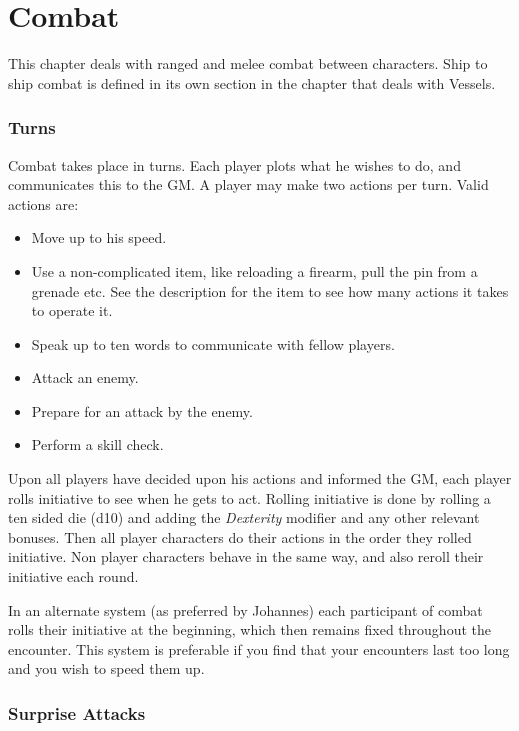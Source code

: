 \chapter{Combat}

This chapter deals with ranged and melee combat between characters. Ship to ship
combat is defined in its own section in the chapter that deals with Vessels.

\subsection{Turns}

Combat takes place in turns. Each player plots what he wishes to do, and
communicates this to the GM. A player may make two actions per turn. Valid
actions are:

\begin{itemize}
\item Move up to his speed.
\item Use a non-complicated item, like reloading a firearm, pull the pin from a
  grenade etc. See the description for the item to see how many actions it takes
  to operate it.
\item Speak up to ten words to communicate with fellow players.
\item Attack an enemy.
\item Prepare for an attack by the enemy.
\item Perform a skill check.
\end{itemize}

Upon all players have decided upon his actions and informed the GM, each player
rolls initiative to see when he gets to act. Rolling initiative is done by
rolling a ten sided die (d10) and adding the \emph{Dexterity} modifier and any
other relevant bonuses. Then all player characters do their actions in the
order they rolled initiative. Non player characters behave in the same way,
and also reroll their initiative each round.

In an alternate system (as preferred by Johannes) each participant of combat
rolls their initiative at the beginning, which then remains fixed throughout the
encounter. This system is preferable if you find that your encounters last too
long and you wish to speed them up.

\subsection{Surprise Attacks}

